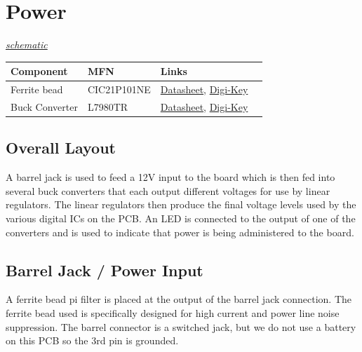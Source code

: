 \section{Power}
\label{sec:power}
\textit{\hyperlink{schematic.8}{schematic}}

\label{tab:power-schematic-components}
\begin{tabularx}{\textwidth}{l l X>{\raggedright\arraybackslash}X}
  \toprule
  \textbf{Component} & \textbf{MFN} & \textbf{Links} \\
  \midrule
  \endhead

  Ferrite bead & CIC21P101NE &
  \href{http://www.samsungsem.com/kr/support/product-search/bead/__icsFiles/afieldfile/2014/11/13/S_CIC21P101NE.pdf}{Datasheet},
  \href{https://www.digikey.com/product-detail/en/mpd-memory-protection-devices/EJ508A/EJ508A-ND/2439547}{Digi-Key}
  \\
  Buck Converter & L7980TR &
  \href{https://www.st.com/content/ccc/resource/technical/document/datasheet/19/f6/ef/53/6a/98/4f/36/CD00217462.pdf/files/CD00217462.pdf/jcr:content/translations/en.CD00217462.pdf}{Datasheet},
  \href{https://www.digikey.com/product-detail/en/stmicroelectronics/L7980TR/497-10813-1-ND/2469161}{Digi-Key}
  \\

  \bottomrule
\end{tabularx}

\subsection{Overall Layout}
\label{sec:power-overall-layout}

A barrel jack is used to feed a 12V input to the board which is then fed into several buck
converters that each output different voltages for use by linear regulators. The linear regulators
then produce the final voltage levels used by the various digital ICs on the PCB. An LED is
connected to the output of one of the converters and is used to indicate that power is being
administered to the board.

\subsection{Barrel Jack / Power Input}
\label{sec:power-input}

A ferrite bead pi filter is placed at the output of the barrel jack connection. The ferrite bead
used is specifically designed for high current and power line noise suppression. The barrel
connector is a switched jack, but we do not use a battery on this PCB so the 3rd pin is grounded.

